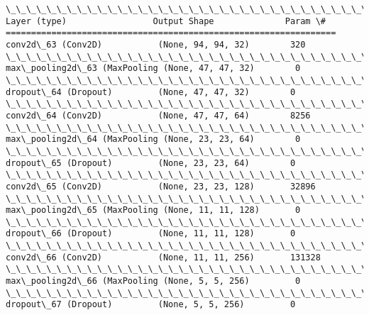 \documentclass[11pt]{article}
\begin{document}
    \begin{Verbatim}[commandchars=\\\{\}]
\_\_\_\_\_\_\_\_\_\_\_\_\_\_\_\_\_\_\_\_\_\_\_\_\_\_\_\_\_\_\_\_\_\_\_\_\_\_\_\_\_\_\_\_\_\_\_\_\_\_\_\_\_\_\_\_\_\_\_\_\_\_\_\_\_
Layer (type)                 Output Shape              Param \#   
=================================================================
conv2d\_63 (Conv2D)           (None, 94, 94, 32)        320       
\_\_\_\_\_\_\_\_\_\_\_\_\_\_\_\_\_\_\_\_\_\_\_\_\_\_\_\_\_\_\_\_\_\_\_\_\_\_\_\_\_\_\_\_\_\_\_\_\_\_\_\_\_\_\_\_\_\_\_\_\_\_\_\_\_
max\_pooling2d\_63 (MaxPooling (None, 47, 47, 32)        0         
\_\_\_\_\_\_\_\_\_\_\_\_\_\_\_\_\_\_\_\_\_\_\_\_\_\_\_\_\_\_\_\_\_\_\_\_\_\_\_\_\_\_\_\_\_\_\_\_\_\_\_\_\_\_\_\_\_\_\_\_\_\_\_\_\_
dropout\_64 (Dropout)         (None, 47, 47, 32)        0         
\_\_\_\_\_\_\_\_\_\_\_\_\_\_\_\_\_\_\_\_\_\_\_\_\_\_\_\_\_\_\_\_\_\_\_\_\_\_\_\_\_\_\_\_\_\_\_\_\_\_\_\_\_\_\_\_\_\_\_\_\_\_\_\_\_
conv2d\_64 (Conv2D)           (None, 47, 47, 64)        8256      
\_\_\_\_\_\_\_\_\_\_\_\_\_\_\_\_\_\_\_\_\_\_\_\_\_\_\_\_\_\_\_\_\_\_\_\_\_\_\_\_\_\_\_\_\_\_\_\_\_\_\_\_\_\_\_\_\_\_\_\_\_\_\_\_\_
max\_pooling2d\_64 (MaxPooling (None, 23, 23, 64)        0         
\_\_\_\_\_\_\_\_\_\_\_\_\_\_\_\_\_\_\_\_\_\_\_\_\_\_\_\_\_\_\_\_\_\_\_\_\_\_\_\_\_\_\_\_\_\_\_\_\_\_\_\_\_\_\_\_\_\_\_\_\_\_\_\_\_
dropout\_65 (Dropout)         (None, 23, 23, 64)        0         
\_\_\_\_\_\_\_\_\_\_\_\_\_\_\_\_\_\_\_\_\_\_\_\_\_\_\_\_\_\_\_\_\_\_\_\_\_\_\_\_\_\_\_\_\_\_\_\_\_\_\_\_\_\_\_\_\_\_\_\_\_\_\_\_\_
conv2d\_65 (Conv2D)           (None, 23, 23, 128)       32896     
\_\_\_\_\_\_\_\_\_\_\_\_\_\_\_\_\_\_\_\_\_\_\_\_\_\_\_\_\_\_\_\_\_\_\_\_\_\_\_\_\_\_\_\_\_\_\_\_\_\_\_\_\_\_\_\_\_\_\_\_\_\_\_\_\_
max\_pooling2d\_65 (MaxPooling (None, 11, 11, 128)       0         
\_\_\_\_\_\_\_\_\_\_\_\_\_\_\_\_\_\_\_\_\_\_\_\_\_\_\_\_\_\_\_\_\_\_\_\_\_\_\_\_\_\_\_\_\_\_\_\_\_\_\_\_\_\_\_\_\_\_\_\_\_\_\_\_\_
dropout\_66 (Dropout)         (None, 11, 11, 128)       0         
\_\_\_\_\_\_\_\_\_\_\_\_\_\_\_\_\_\_\_\_\_\_\_\_\_\_\_\_\_\_\_\_\_\_\_\_\_\_\_\_\_\_\_\_\_\_\_\_\_\_\_\_\_\_\_\_\_\_\_\_\_\_\_\_\_
conv2d\_66 (Conv2D)           (None, 11, 11, 256)       131328    
\_\_\_\_\_\_\_\_\_\_\_\_\_\_\_\_\_\_\_\_\_\_\_\_\_\_\_\_\_\_\_\_\_\_\_\_\_\_\_\_\_\_\_\_\_\_\_\_\_\_\_\_\_\_\_\_\_\_\_\_\_\_\_\_\_
max\_pooling2d\_66 (MaxPooling (None, 5, 5, 256)         0         
\_\_\_\_\_\_\_\_\_\_\_\_\_\_\_\_\_\_\_\_\_\_\_\_\_\_\_\_\_\_\_\_\_\_\_\_\_\_\_\_\_\_\_\_\_\_\_\_\_\_\_\_\_\_\_\_\_\_\_\_\_\_\_\_\_
dropout\_67 (Dropout)         (None, 5, 5, 256)         0         

\end{Verbatim}
\end{document}
